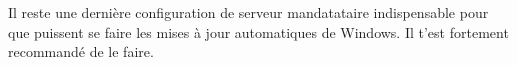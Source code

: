 \label{horsdomaine} %



Il reste une derni\`ere configuration de
serveur mandatataire indispensable pour que puissent se faire les mises \`a  jour automatiques
de Windows. Il t'est fortement recommand\'e de le faire.

